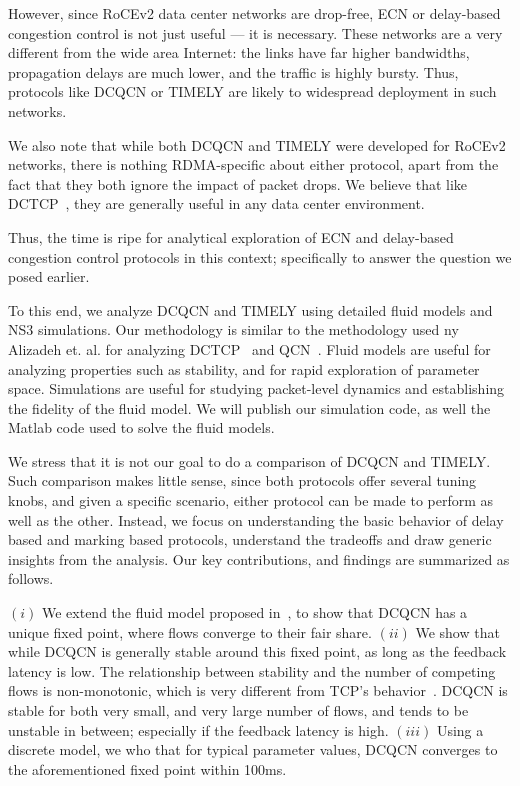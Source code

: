 However, since RoCEv2 data center networks are drop-free, ECN or
delay-based congestion control is not just useful --- it is necessary. These
networks are a very different from the wide area Internet: the links have far
higher bandwidths, propagation delays are much lower, and the traffic is highly
bursty. Thus, protocols like DCQCN or TIMELY are likely to widespread deployment
in such networks.

We also note that while both DCQCN and TIMELY were developed for RoCEv2
networks, there is nothing RDMA-specific about either protocol, apart from the
fact that they both ignore the impact of packet drops. We believe that like
DCTCP~\cite{dctcp}, they are generally useful in any data center environment.

Thus, the time is ripe for analytical exploration of ECN and delay-based
congestion control protocols in this context; specifically to answer the
question we posed earlier.


To this end, we analyze DCQCN and TIMELY using detailed fluid models and NS3
simulations. Our methodology is similar to the methodology used ny Alizadeh et.
al. for analyzing DCTCP~\cite{dctcp-analysis} and QCN~\cite{qcn-analysis}. Fluid
models are useful for analyzing properties such as stability, and for rapid
exploration of parameter space.  Simulations are useful for studying
packet-level dynamics and establishing the fidelity of the fluid model.  We will
publish our simulation code, as well the Matlab code used to solve the fluid
models.


We stress that it is not our goal to do a comparison of DCQCN and
TIMELY.  Such comparison makes little sense, since both protocols offer several
tuning knobs, and given a specific scenario, either protocol can be made to
perform as well as the other. Instead, we focus on understanding the basic
behavior of delay based and marking based protocols, understand the
tradeoffs and draw generic insights from the analysis.
Our key contributions, and findings are summarized as follows.

 $(i)$ We extend the fluid model proposed in~\cite{dcqcn}, to
show that DCQCN has a unique fixed point, where flows converge to their fair
share. $(ii)$ We show that while DCQCN is generally stable around this
fixed point, as long as the feedback latency is low. The relationship between
stability and the number of competing flows is non-monotonic, which is very
different from TCP's behavior~\cite{misra:TAC2002}. DCQCN is stable for both
very small, and very large number of flows, and tends to be unstable in between;
especially if the feedback latency is high.  $(iii)$ Using a discrete model, we
who that for typical parameter values, DCQCN converges to the aforementioned
fixed point within 100ms.

